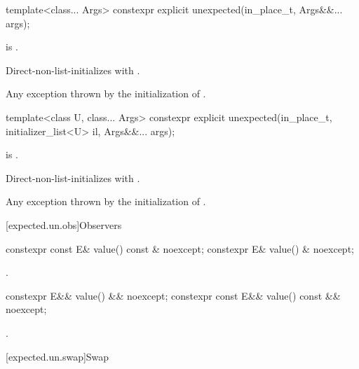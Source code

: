 %
\begin{itemdecl}
template<class... Args>
  constexpr explicit unexpected(in_place_t, Args&&... args);
\end{itemdecl}

\begin{itemdescr}
\pnum
\constraints
{} is .

\pnum
\effects
Direct-non-list-initializes
 with .

\pnum
\throws
Any exception thrown by the initialization of .
\end{itemdescr}

%
\begin{itemdecl}
template<class U, class... Args>
  constexpr explicit unexpected(in_place_t, initializer_list<U> il, Args&&... args);
\end{itemdecl}

\begin{itemdescr}
\pnum
\constraints
{} is .

\pnum
\effects
Direct-non-list-initializes
 with .

\pnum
\throws
Any exception thrown by the initialization of .
\end{itemdescr}

[expected.un.obs]{Observers}

%
\begin{itemdecl}
constexpr const E& value() const & noexcept;
constexpr E& value() & noexcept;
\end{itemdecl}

\begin{itemdescr}
\pnum
\returns
{}.
\end{itemdescr}

%
\begin{itemdecl}
constexpr E&& value() && noexcept;
constexpr const E&& value() const && noexcept;
\end{itemdecl}

\begin{itemdescr}
\pnum
\returns
{}.
\end{itemdescr}

[expected.un.swap]{Swap}

